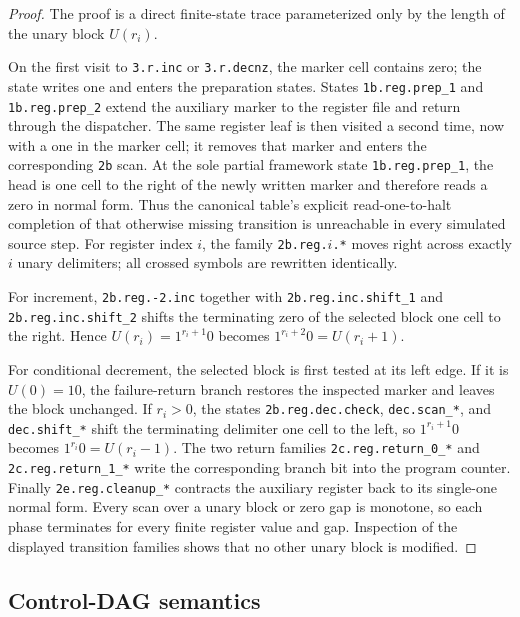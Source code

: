 \documentclass[10pt]{article}
\theoremstyle{definition}
\begin{document}
\begin{proof}
The proof is a direct finite-state trace parameterized only by the length of
the unary block $U(r_i)$.

On the first visit to \texttt{3.r.inc} or \texttt{3.r.decnz}, the marker
cell contains zero; the state writes one and enters the preparation states.
States \texttt{1b.reg.prep\_1} and \texttt{1b.reg.prep\_2} extend the
auxiliary marker to the register file and return through the dispatcher.  The
same register leaf is then visited a second time, now with a one in the marker
cell; it removes that marker and enters the corresponding \texttt{2b} scan.
At the sole partial framework state \texttt{1b.reg.prep\_1}, the head is one
cell to the right of the newly written marker and therefore reads a zero in
normal form.  Thus the canonical table's explicit read-one-to-halt completion
of that otherwise missing transition is unreachable in every simulated source
step.  For register index $i$, the family \texttt{2b.reg.$i$.*} moves right
across exactly $i$ unary delimiters; all crossed symbols are rewritten
identically.

For increment, \texttt{2b.reg.-2.inc} together with
\texttt{2b.reg.inc.shift\_1} and \texttt{2b.reg.inc.shift\_2} shifts the
terminating zero of the selected block one cell to the right.  Hence
$U(r_i)=1^{r_i+1}0$ becomes $1^{r_i+2}0=U(r_i+1)$.

For conditional decrement, the selected block is first tested at its left
edge.  If it is $U(0)=10$, the failure-return branch restores the inspected
marker and leaves the block unchanged.  If $r_i>0$, the states
\texttt{2b.reg.dec.check}, \texttt{dec.scan\_*}, and
\texttt{dec.shift\_*} shift the terminating delimiter one cell to the left,
so $1^{r_i+1}0$ becomes $1^{r_i}0=U(r_i-1)$.  The two return families
\texttt{2c.reg.return\_0\_*} and \texttt{2c.reg.return\_1\_*} write the
corresponding branch bit into the program counter.  Finally
\texttt{2e.reg.cleanup\_*} contracts the auxiliary register back to its
single-one normal form.  Every scan over a unary block or zero gap is
monotone, so each phase terminates for every finite register value and gap.
Inspection of the displayed transition families shows that no other unary
block is modified.
\end{proof}

\subsection{Control-DAG semantics}
\end{document}
